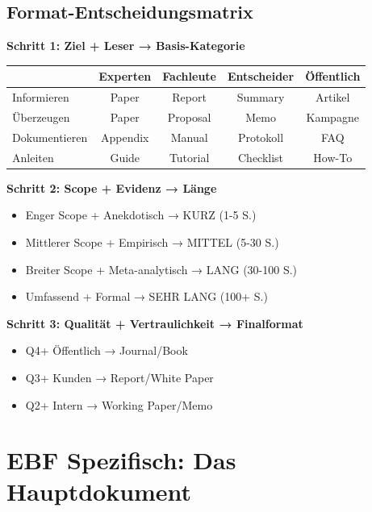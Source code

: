 \documentclass[12pt,a4paper]{article}
\begin{document}
\subsection{Format-Entscheidungsmatrix}

\begin{tcolorbox}[colback=green!5!white, colframe=green!75!black, 
    title=Format-Ableitung: Der Algorithmus]

\textbf{Schritt 1: Ziel + Leser → Basis-Kategorie}
\begin{center}
\begin{tabular}{@{}l|cccc@{}}
& Experten & Fachleute & Entscheider & Öffentlich \\
\hline
Informieren & Paper & Report & Summary & Artikel \\
Überzeugen & Paper & Proposal & Memo & Kampagne \\
Dokumentieren & Appendix & Manual & Protokoll & FAQ \\
Anleiten & Guide & Tutorial & Checklist & How-To \\
\end{tabular}
\end{center}

\textbf{Schritt 2: Scope + Evidenz → Länge}
\begin{itemize}[nosep]
\item Enger Scope + Anekdotisch → KURZ (1-5 S.)
\item Mittlerer Scope + Empirisch → MITTEL (5-30 S.)
\item Breiter Scope + Meta-analytisch → LANG (30-100 S.)
\item Umfassend + Formal → SEHR LANG (100+ S.)
\end{itemize}

\textbf{Schritt 3: Qualität + Vertraulichkeit → Finalformat}
\begin{itemize}[nosep]
\item Q4+ Öffentlich → Journal/Book
\item Q3+ Kunden → Report/White Paper
\item Q2+ Intern → Working Paper/Memo
\end{itemize}

\end{tcolorbox}


\section{EBF Spezifisch: Das Hauptdokument}
\end{document}
